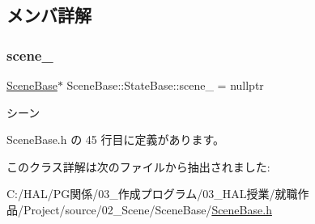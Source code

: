 \subsection{メンバ詳解}
\mbox{\label{class_scene_base_1_1_state_base_ae1062afb3f96664e24504151eaccf40f}} 
\subsubsection{\texorpdfstring{scene\+\_\+}{scene\_}}
{\footnotesize\ttfamily \mbox{\hyperlink{class_scene_base}{Scene\+Base}}$\ast$ Scene\+Base\+::\+State\+Base\+::scene\+\_\+ = nullptr\hspace{0.3cm}{\ttfamily [protected]}}



シーン 



 Scene\+Base.\+h の 45 行目に定義があります。



このクラス詳解は次のファイルから抽出されました\+:\begin{DoxyCompactItemize}
\item 
C\+:/\+H\+A\+L/\+P\+G関係/03\+\_\+作成プログラム/03\+\_\+\+H\+A\+L授業/就職作品/\+Project/source/02\+\_\+\+Scene/\+Scene\+Base/\mbox{\hyperlink{_scene_base_8h}{Scene\+Base.\+h}}\end{DoxyCompactItemize}
